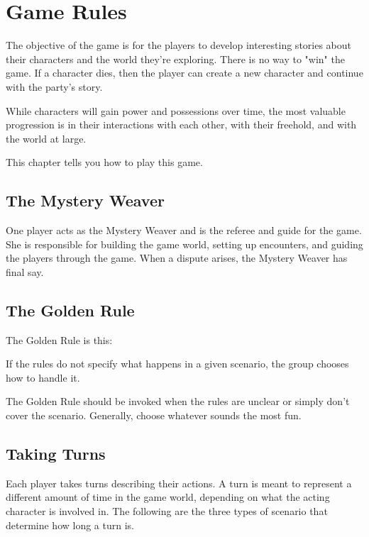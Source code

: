 \chapter{Game Rules}

\begin{multicols}{2}

The objective of the game is for the players to develop interesting
stories about their characters and the world they're exploring. There
is no way to "win" the game. If a character dies, then the player can
create a new character and continue with the party's story.

While characters will gain power and possessions over time, the most
valuable progression is in their interactions with each other, with
their freehold, and with the world at large.

This chapter tells you how to play this game.

\section{The Mystery Weaver}

One player acts as the Mystery Weaver and is the referee and guide for
the game. She is responsible for building the game world, setting up
encounters, and guiding the players through the game. When a dispute
arises, the Mystery Weaver has final say.

\section{The Golden Rule}

The Golden Rule is this:

\begin{displayquote}
If the rules do not specify what happens in a given scenario,
the group chooses how to handle it.
\end{displayquote}

The Golden Rule should be invoked when the rules are unclear or simply
don't cover the scenario. Generally, choose whatever sounds the most fun.

\section{Taking Turns}

Each player takes turns describing their actions. A turn is meant to
represent a different amount of time in the game world, depending on
what the acting character is involved in. The following are the three
types of scenario that determine how long a turn is.


\end{multicols}
